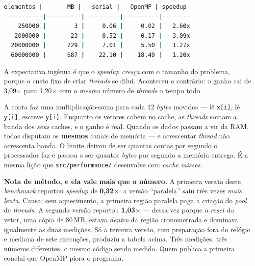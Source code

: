 \begin{lstlisting}[style=bt, language=bash,
    caption={Saída de \texttt{./build/omp\_saxpy}, mediana de 7 execuções, 24
             \emph{threads} disponíveis. Tempos em milissegundos.}]
 elementos |       MB |   serial |   OpenMP | speedup
-----------|----------|----------|----------|--------
    250000 |        3 |     0.06 |     0.02 |   2.60x
   2000000 |       23 |     0.52 |     0.17 |   3.09x
  20000000 |      229 |     7.01 |     5.50 |   1.27x
  60000000 |      687 |    22.10 |    18.49 |   1.20x
\end{lstlisting}

A expectativa ingênua é que o \emph{speedup} \emph{cresça} com o tamanho do
problema, porque o custo fixo de criar \emph{threads} se dilui. Aconteceu o
contrário: o ganho cai de 3{,}09$\times$ para 1{,}20$\times$ com o \emph{mesmo}
número de \emph{threads} o tempo todo.

\begin{porque}
A conta faz uma multiplicação-soma para cada 12 \emph{bytes} movidos --- lê
\texttt{x[i]}, lê \texttt{y[i]}, escreve \texttt{y[i]}. Enquanto os vetores
cabem no cache, as \emph{threads} somam a banda dos \emph{seus} caches, e o
ganho é real. Quando os dados passam a vir da RAM, todas disputam os
\textbf{mesmos} canais de memória --- e acrescentar \emph{thread} não
acrescenta banda. O limite deixou de ser quantas contas por segundo o
processador faz e passou a ser quantos \emph{bytes} por segundo a memória
entrega. É a mesma lição que \texttt{src/performance/} desenvolve com
\emph{cache misses}.
\end{porque}

\begin{aviso}
\textbf{Nota de método, e ela vale mais que o número.} A primeira versão deste
\emph{benchmark} reportou \emph{speedup} de \textbf{0,32$\times$}: a versão
``paralela'' saiu três vezes \emph{mais lenta}. Causa: sem aquecimento, a
primeira região paralela paga a criação do \emph{pool} de \emph{threads}. A
segunda versão reportou \textbf{1,03$\times$} --- dessa vez porque o
\emph{reset} do vetor, uma cópia de 80\,MB, estava \emph{dentro} da região
cronometrada e dominava igualmente as duas medições. Só a terceira versão, com
preparação fora do relógio e mediana de sete execuções, produziu a tabela
acima. Três medições, três números diferentes, o mesmo código sendo medido.
Quem publica a primeira conclui que OpenMP piora o programa.
\end{aviso}

